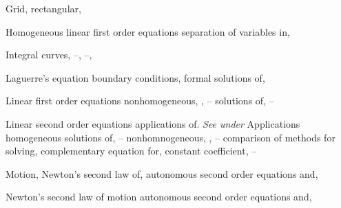 \begin{tindex}


\item Grid, rectangular, \pageref{figure:1.3.1}


\item Homogeneous linear first order equations
\subitem  separation of variables in, \pageref{eq:2.1.16}


\item Integral curves,  \pageref{example:1.2.1}--\pageref{example:1.2.3},
\pageref{eq:8.3.1}--\pageref{exer:1.3.24},


\item Laguerre's equation
\subitem boundary conditions,
\subitem formal solutions of,

\item Linear first order equations
\subitem nonhomogeneous,  \pageref{eq:2.1.1},
\pageref{eq:2.1.16}--\pageref{exer:2.1.1}
\subitem solutions of, \pageref{eq:2.1.2}--\pageref{eq:2.1.6}

\item Linear second order equations
\subitem applications of. \emph{See under} Applications
\subitem homogeneous
\subsubitem solutions of,   \pageref{eq:5.1.1}--\pageref{thmtype:5.1.2}
\subitem nonhomnogeneous,  \pageref{eq:5.1.1},
\pageref{eq:5.3.1}--\pageref{exer:5.7.39}
\subsubitem comparison of methods for solving, \pageref{exer:5.1.1}
\subsubitem complementary equation for,  \pageref{eq:5.3.2}
\subsubitem constant coefficient, \pageref{eq:5.4.1}--\pageref{eq:5.6.1}


\item Motion,
\subitem Newton's  second law of,
\subsubitem autonomous second order equations and, \pageref{eq:4.4.6}


\item Newton's second law of motion
\subitem autonomous second order equations and, \pageref{eq:4.4.6}


\end{tindex}
